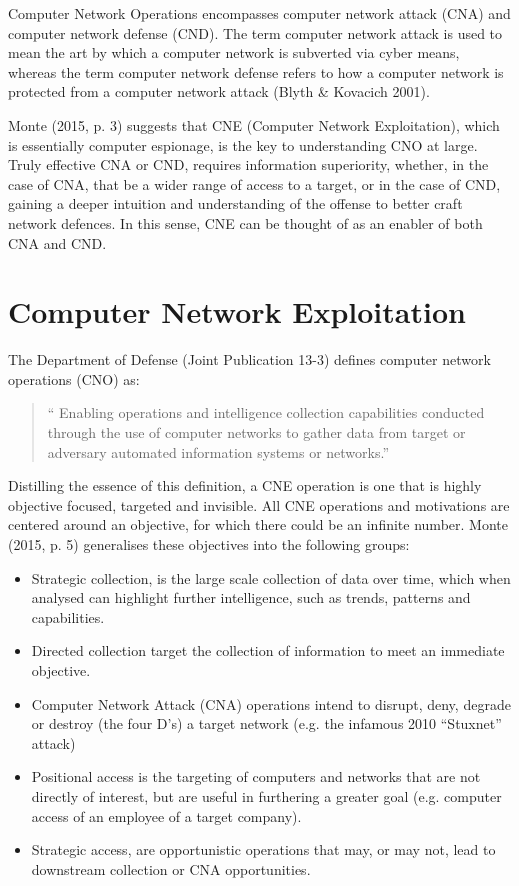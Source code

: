 \documentclass[11pt]{report}
\begin{document}
Computer Network Operations encompasses computer network attack (CNA) and computer network defense (CND). The term computer network attack is used to mean the art by which a computer network is subverted via cyber means, whereas the term computer network defense refers to how a computer network is protected from a computer network attack (Blyth \& Kovacich 2001).

Monte (2015, p. 3) \cite{monte} suggests that CNE (Computer Network Exploitation), which is essentially computer espionage, is the key to understanding CNO at large. Truly effective CNA or CND, requires information superiority, whether, in the case of CNA, that be a wider range of access to a target, or in the case of CND, gaining a deeper intuition and understanding of the offense to better craft network defences. In this sense, CNE can be thought of as an enabler of both CNA and CND.



\section{Computer Network Exploitation}

The Department of Defense (Joint Publication 13-3) defines computer network operations (CNO) as: \begin{quote}`` Enabling operations and intelligence collection capabilities conducted through the use of computer networks to gather data from target or adversary automated information systems or networks.''\end{quote}

Distilling the essence of this definition, a CNE operation is one that is highly objective focused, targeted and invisible. All CNE operations and motivations are centered around an objective, for which there could be an infinite number. Monte (2015, p. 5) \cite{monte} generalises these objectives into the following groups:

\begin{itemize}
	\item Strategic collection, is the large scale collection of data over time, which when analysed can highlight further intelligence, such as trends, patterns and capabilities.
	\item Directed collection target the collection of information to meet an immediate objective.
	\item Computer Network Attack (CNA) operations intend to disrupt, deny, degrade or destroy (the four D’s) a target network (e.g. the infamous 2010 “Stuxnet” attack)
	\item Positional access is the targeting of computers and networks that are not directly of interest, but are useful in furthering a greater goal (e.g. computer access of an employee of a target company).
	\item Strategic access, are opportunistic operations that may, or may not, lead to downstream collection or CNA opportunities.
\end{itemize}
\end{document}
